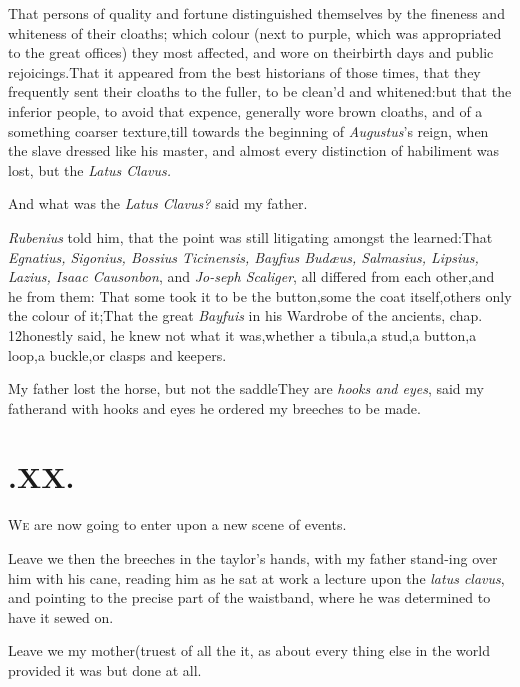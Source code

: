 \documentclass{article}
\begin{document}
\tsh That persons of quality and fortune distinguished
themselves by the fineness and whiteness of their cloaths; which
colour (next to purple, which was appropriated to the great
offices) they most affected, and wore on their\pb birth days and
public rejoicings.\tsh That it appeared from the best
historians of those times, that they frequently sent their cloaths
to the fuller, to be clean’d and whitened:\tsh but
that the inferior people, to avoid that expence, generally wore
brown cloaths, and of a something coarser texture,\tsk till
towards the beginning of \textit{Augustus}’s reign, when the
slave dressed like his master, and almost every distinction of
habiliment was lost, but the \textit{Latus Clavus.}

And what was the \textit{Latus Clavus?} said my father.

\textit{Rubenius} told him, that the point was still litigating
amongst the learned:\tsh That \textit{Egnatius, Sigonius,
Bossius Ticinensis, Bayfius Budæus, Salmasius, Lipsius,
Lazius, Isaac Causonbon}, and \textit{Jo-\pb seph Scaliger}, all
differed from each other,\tsk and he from them: That some took it
to be the button,\tsk some the coat itself,\tsk others only the
colour of it;\tsk That the great \textit{Bayfuis} in his Wardrobe
of the ancients, chap.\,12\tsk honestly said, he knew not what it
was,\tsk whether a tibula,\tsk a stud,\tsk a button,\tsk a
loop,\tsk a buckle,\tsk or clasps and
keepers.\tsh

\tsh My father lost the horse, but not the
saddle\tsh They are \textit{hooks and eyes}, said my
father\tsh and with hooks and eyes he ordered my breeches
to be made.

\section{.\enspace XX.}

\lettrine{W}{e} are now going to enter upon a new
scene of events.\tsh

\tsh Leave we then the breeches in the taylor’s
hands, with my father stand-\pb ing over him with his cane, reading him
as he sat at work a lecture upon the \textit{latus clavus}, and
pointing to the precise part of the waistband, where he was
determined to have it sewed on.\tsh

Leave we my mother\tsk (truest of all the\break
{}\break
it, as about every thing else in the world
\tsh provided it was but done at all.\tsh
\end{document}
